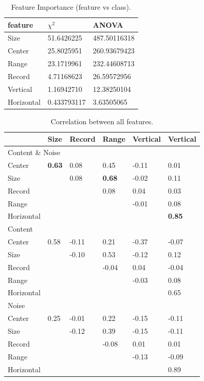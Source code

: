 \begin{table}[h]
\centering
\caption{Feature Importance (feature vs class).}
\label{tab:importance}
\begin{tabular}{| l | l | l |}
\hline
feature & $\chi^2$ & ANOVA \\
\hline
Size       & 51.6426225  & 487.50116318 \\
Center     & 25.8025951  & 260.93679423 \\
Range      & 23.1719961  & 232.44608713 \\
Record     & 4.71168623  & 26.59572956 \\
Vertical   & 1.16942710  & 12.38250104 \\
Horizontal & 0.433793117 & 3.63505065 \\
\hline
\end{tabular}
\end{table}
         
\begin{table}[h]
\centering
\caption{Correlation between all features.}
\label{tab:featcorr}
\begin{tabular}{ | l | l | l | l | l | l |}
\hline
& Size & Record & Range & Vertical & Vertical \\ \hline
\multicolumn{6}{|l|}{Content \& Noise} \\
\hline
Center & \textbf{0.63} & 0.08 & 0.45 & -0.11 & 0.01 \\
Size & & 0.08 & \textbf{0.68} & -0.02 & 0.11 \\
Record & & & 0.08 & 0.04 & 0.03 \\
Range & & & & -0.01 & 0.08 \\
Horizontal & & & & & \textbf{0.85} \\
\hline
\multicolumn{6}{|l|}{Content} \\
\hline
Center & 0.58 & -0.11 & 0.21 & -0.37 & -0.07 \\
Size & & -0.10 & 0.53 & -0.12 & 0.12 \\
Record & & & -0.04 & 0.04 & -0.04 \\
Range & & & & -0.03 & 0.08 \\
Horizontal & & & & & 0.65 \\
\hline
\multicolumn{6}{|l|}{Noise} \\
\hline
Center & 0.25 & -0.01 & 0.22 & -0.15 & -0.11 \\
Size & & -0.12 & 0.39 & -0.15 & -0.11 \\
Record & & & -0.08 & 0.01 & 0.01 \\
Range & & & & -0.13 & -0.09 \\
Horizontal & & & & & 0.89 \\
\hline
\end{tabular}
\end{table}

